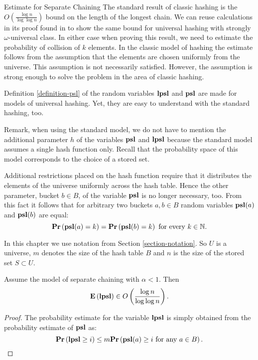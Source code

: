 \begin{section}{Estimate for Separate Chaining}
The standard result of classic hashing is the $O\left(\frac{\log n}{\log \log n}\right)$ bound on the length of the longest chain. We can reuse calculations in its proof found in \cite{DBLP:books/sp/Mehlhorn84} to show the same bound for universal hashing with strongly $\omega$-universal class. In either case when proving this result, we need to estimate the probability of collision of $k$ elements. In the classic model of hashing the estimate follows from the assumption that the elements are chosen uniformly from the universe. This assumption is not necessarily satisfied. However, the assumption is strong enough to solve the problem in the area of classic hashing. 

Definition \ref{definition-psl} of the random variables $\mathbf{lpsl}$ and $\mathbf{psl}$ are made for models of universal hashing. Yet, they are easy to understand with the standard hashing, too. 

Remark, when using the standard model, we do not have to mention the additional parameter $h$ of the variables $\mathbf{psl}$ and $\mathbf{lpsl}$ because the standard model assumes a single hash function only. Recall that the probability space of this model corresponds to the choice of a stored set. 

Additional restrictions placed on the hash function require that it distributes the elements of the universe uniformly across the hash table. Hence the other parameter, bucket $b \in B$, of the variable $\mathbf{psl}$ is no longer necessary, too. From this fact it follows that for arbitrary two buckets $a, b \in B$ random variables $\mathbf{psl}(a)$ and $\mathbf{psl}(b)$ are equal: \[\mathbf{Pr}\left(\mathbf{psl}(a) = k\right) = \mathbf{Pr}\left(\mathbf{psl}(b) = k\right) \text{ for every } k \in \mathbb{N} \text{.}\] 

In this chapter we use notation from Section \ref{section-notation}. So $U$ is a universe, $m$ denotes the size of the hash table $B$ and $n$ is the size of the stored set $S \subset U$.

\begin{theorem}
Assume the model of separate chaining with $\alpha < 1$. Then 
\[
\mathbf{E}\left(\mathbf{lpsl}\right) \in O\left(\frac{\log n}{\log \log n}\right) \text{.}
\]
\end{theorem}
\begin{proof}
The probability estimate for the variable $\mathbf{lpsl}$ is simply obtained from the probability estimate of $\mathbf{psl}$ as:
\begin{displaymath}
\mathbf{Pr}\left(\mathbf{lpsl} \geq i\right) \leq m \mathbf{Pr}\left(\mathbf{psl}(a) \geq i \text{ for any } a \in B\right) \text{.}
\end{displaymath}


\end{proof}
\end{section}
